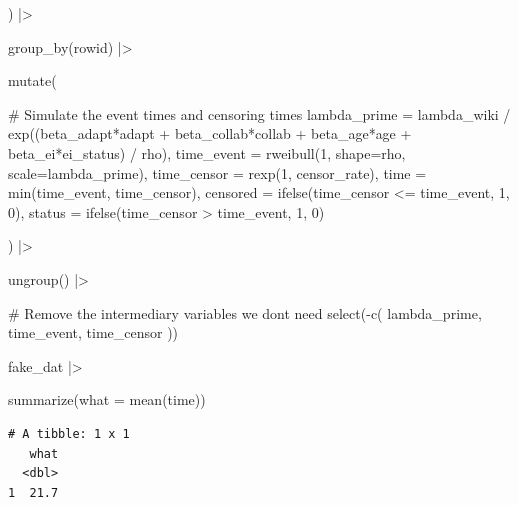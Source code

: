 \documentclass[
  letterpaper,
  DIV=11,
  numbers=noendperiod]{scrreprt}
\newenvironment{Shaded}{\begin{snugshade}}{\end{snugshade}}
\newcommand{\AttributeTok}[1]{\textcolor[rgb]{0.40,0.45,0.13}{#1}}
\newcommand{\CommentTok}[1]{\textcolor[rgb]{0.37,0.37,0.37}{#1}}
\newcommand{\DecValTok}[1]{\textcolor[rgb]{0.68,0.00,0.00}{#1}}
\newcommand{\FunctionTok}[1]{\textcolor[rgb]{0.28,0.35,0.67}{#1}}
\newcommand{\NormalTok}[1]{\textcolor[rgb]{0.00,0.23,0.31}{#1}}
\newcommand{\SpecialCharTok}[1]{\textcolor[rgb]{0.37,0.37,0.37}{#1}}
\begin{document}
\begin{Shaded}
\begin{Highlighting}[]
\NormalTok{  ) }\SpecialCharTok{|\textgreater{}}

  \FunctionTok{group\_by}\NormalTok{(rowid) }\SpecialCharTok{|\textgreater{}}

  \FunctionTok{mutate}\NormalTok{(}

    \CommentTok{\# Simulate the event times and censoring times}
    \AttributeTok{lambda\_prime =}\NormalTok{ lambda\_wiki }\SpecialCharTok{/} \FunctionTok{exp}\NormalTok{((beta\_adapt}\SpecialCharTok{*}\NormalTok{adapt }\SpecialCharTok{+}\NormalTok{ beta\_collab}\SpecialCharTok{*}\NormalTok{collab }\SpecialCharTok{+}\NormalTok{ beta\_age}\SpecialCharTok{*}\NormalTok{age }\SpecialCharTok{+}\NormalTok{ beta\_ei}\SpecialCharTok{*}\NormalTok{ei\_status) }\SpecialCharTok{/}\NormalTok{ rho),}
    \AttributeTok{time\_event =} \FunctionTok{rweibull}\NormalTok{(}\DecValTok{1}\NormalTok{, }\AttributeTok{shape=}\NormalTok{rho, }\AttributeTok{scale=}\NormalTok{lambda\_prime),}
    \AttributeTok{time\_censor =} \FunctionTok{rexp}\NormalTok{(}\DecValTok{1}\NormalTok{, censor\_rate),}
    \AttributeTok{time =} \FunctionTok{min}\NormalTok{(time\_event, time\_censor),}
    \AttributeTok{censored =} \FunctionTok{ifelse}\NormalTok{(time\_censor }\SpecialCharTok{\textless{}=}\NormalTok{ time\_event, }\DecValTok{1}\NormalTok{, }\DecValTok{0}\NormalTok{),}
    \AttributeTok{status =} \FunctionTok{ifelse}\NormalTok{(time\_censor }\SpecialCharTok{\textgreater{}}\NormalTok{ time\_event, }\DecValTok{1}\NormalTok{, }\DecValTok{0}\NormalTok{)}

\NormalTok{  ) }\SpecialCharTok{|\textgreater{}}

  \FunctionTok{ungroup}\NormalTok{() }\SpecialCharTok{|\textgreater{}}

  \CommentTok{\# Remove the intermediary variables we don\textquotesingle{}t need}
  \FunctionTok{select}\NormalTok{(}\SpecialCharTok{{-}}\FunctionTok{c}\NormalTok{(}
\NormalTok{    lambda\_prime,}
\NormalTok{    time\_event,}
\NormalTok{    time\_censor}
\NormalTok{  ))}

\NormalTok{fake\_dat }\SpecialCharTok{|\textgreater{}}

  \FunctionTok{summarize}\NormalTok{(}\AttributeTok{what =} \FunctionTok{mean}\NormalTok{(time))}
\end{Highlighting}
\end{Shaded}

\begin{verbatim}
# A tibble: 1 x 1
   what
  <dbl>
1  21.7
\end{verbatim}
\end{document}
